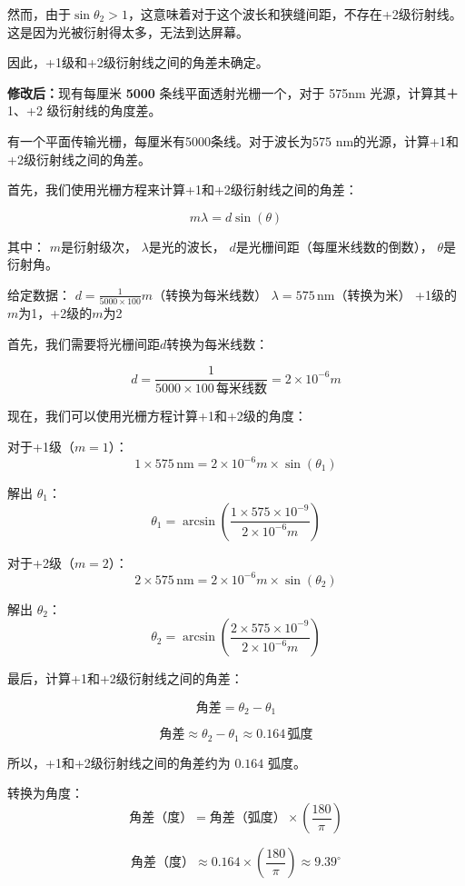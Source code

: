 \documentclass[dvipsnames, svgnames,a4paper,11pt]{article}
\begin{document}
	然而，由于\(\sin \theta_2 > 1\)，这意味着对于这个波长和狭缝间距，不存在+2级衍射线。这是因为光被衍射得太多，无法到达屏幕。
	
	因此，+1级和+2级衍射线之间的角差未确定。
	
	\begin{question}
		\textbf{修改后：}现有每厘米 \textbf{5000} 条线平面透射光栅一个，对于 575nm 光源，计算其＋1、+2 级衍射线的角度差。
	\end{question}
		有一个平面传输光栅，每厘米有5000条线。对于波长为575 nm的光源，计算+1和+2级衍射线之间的角差。
	
		首先，我们使用光栅方程来计算+1和+2级衍射线之间的角差：
		
		\[
		m \lambda = d \sin(\theta)
		\]
		
		其中：
		\(m\)是衍射级次，
		\(\lambda\)是光的波长，
		\(d\)是光栅间距（每厘米线数的倒数），
		\(\theta\)是衍射角。
		
		给定数据：
		\(d = \frac{1}{5000 \times 100}m\)（转换为每米线数）
		\(\lambda = 575 \, \text{nm}\)（转换为米）
		+1级的\(m\)为1，+2级的\(m\)为2
		
		首先，我们需要将光栅间距\(d\)转换为每米线数：
		
		\[
		d = \frac{1}{5000 \times 100 \, \text{每米线数}}=2×10^{−6}m
		\]
		
		现在，我们可以使用光栅方程计算+1和+2级的角度：
		
		对于+1级（\(m = 1\)）：
		\[
		1 \times 575 \, \text{nm} = 2×10^{−6}m \times \sin(\theta_1)
		\]
		
		解出 \(\theta_1\)：
		\[
		\theta_1 = \arcsin\left(\frac{1 \times 575 \times 10^{-9}}{2×10^{−6}m}\right)
		\]
		
		对于+2级（\(m = 2\)）：
		\[
		2 \times 575 \, \text{nm} = 2×10^{−6}m \times \sin(\theta_2)
		\]
		
		解出 \(\theta_2\)：
		\[
		\theta_2 = \arcsin\left(\frac{2 \times 575 \times 10^{-9}}{2×10^{−6}m}\right)
		\]
		
		最后，计算+1和+2级衍射线之间的角差：
		
		\[
		\text{角差} = \theta_2 - \theta_1
		\]
		
		\[
		\text{角差} \approx \theta_2 - \theta_1 \approx 0.164 \, \text{弧度}
		\]
		
		所以，+1和+2级衍射线之间的角差约为 \(0.164\) 弧度。
		
		转换为角度：
		\[
		\text{角差（度）} = \text{角差（弧度）} \times \left( \frac{180}{\pi} \right)
		\]
		
		\[
		\text{角差（度）} \approx 0.164 \times \left( \frac{180}{\pi} \right) \approx 9.39^\circ
		\]
		
\end{document}
